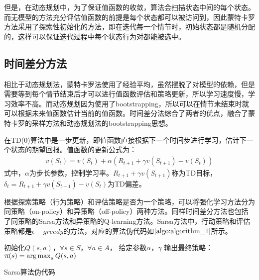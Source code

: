 但是，在动态规划中，为了保证值函数的收敛，算法会扫描状态中间的每个状态。而无模型的方法充分评估值函数的前提是每个状态都可以被访问到，因此蒙特卡罗方法采用了探索性初始化的方法，即在迭代每一个情节时，初始状态都是随机分配的，这样可以保证迭代过程中每个状态行为对都能被选中。

\subsection{时间差分方法}
相比于动态规划法，蒙特卡罗法使用了经验平均，虽然摆脱了对模型的依赖，但是需要等到每个情节结束后才可以进行值函数评估和策略更新，所以学习速度慢，学习效率不高。而动态规划因为使用了bootstrapping，所以可以在情节未结束时就可以根据未来值函数估计当前的值函数。时间差分法综合了两者的优点，融合了蒙特卡罗的采样方法和动态规划法的bootstrapping思想。

在TD(0)算法中是一步更新，即值函数直接根据下一个时间步进行学习，估计下一个状态的期望回报。值函数的更新公式为：
\begin{equation}
\begin{aligned}
v(S_{t})=v(S_{t})+\alpha (R_{t+1}+\gamma v(S_{t+1})-v(S_{t}))
\end{aligned}
\end{equation}
式中，$\alpha$为步长参数，控制学习率。$R_{t+1}+\gamma v(S_{t+1})$称为TD目标，$\delta_{t}=R_{t+1}+\gamma v(S_{t+1})-v(S_{t})$为TD偏差。

根据探索策略（行为策略）和评估策略是否为一个策略，可以将强化学习方法分为同策略（on-policy）和异策略（off-policy）两种方法。同样时间差分方法也包括了同策略的Sarsa方法和异策略的Q-learning方法。Sarsa方法中，行动策略和评估策略都是$\epsilon-greedy$的方法，对应的算法伪代码如$\ref{algo:algorithm_1}$所示。

\begin{algorithm}[htbp]
\small
\SetAlgoLined
{} 

初始化$Q(s,a)$，$\forall s \in S$，$\forall a \in A$， 给定参数$\alpha$，$\gamma$\;
输出最终策略：$\uppi(s)=\operatorname*{arg\,max}_{a}Q(s,a)$\;
\caption{Sarsa算法伪代码}
\label{algo:algorithm_1}
\end{algorithm}

